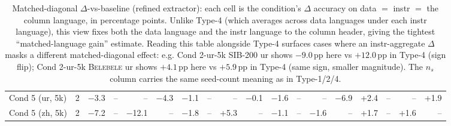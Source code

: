 \begin{table}[t]
\begin{tabular}{lrrrrrrrrrrrrrrrrr}
    Cond 5 (ur, 5k) & 2 & $-$3.3 & -- & -- & $-$4.3 & $-$1.1 & -- & -- & $-$0.1 & $-$1.6 & -- & -- & $-$6.9 & +2.4 & -- & -- & +1.9 \\
    Cond 5 (zh, 5k) & 2 & $-$7.2 & -- & $-$12.1 & -- & $-$1.8 & -- & +5.3 & -- & $-$1.1 & -- & $-$1.6 & -- & +1.7 & -- & +1.6 & -- \\
    \bottomrule
  \end{tabular}
  \caption{Matched-diagonal $\Delta$-vs-baseline (refined extractor): each cell is the condition's $\Delta$ accuracy on data $=$ instr $=$ the column language, in percentage points. Unlike Type-4 (which averages across data languages under each instr language), this view fixes both the data language and the instr language to the column header, giving the tightest ``matched-language gain'' estimate. Reading this table alongside Type-4 surfaces cases where an instr-aggregate $\Delta$ masks a different matched-diagonal effect: e.g. Cond 2-ur-5k \textsc{SIB-200} ur shows $-9.0$\,pp here vs $+12.0$\,pp in Type-4 (sign flip); Cond 2-ur-5k \textsc{Belebele} ur shows $+4.1$\,pp here vs $+5.9$\,pp in Type-4 (same sign, smaller magnitude). The $n_s$ column carries the same seed-count meaning as in Type-1/2/4.}
  \label{tab:t2-native-delta}
\end{table}



